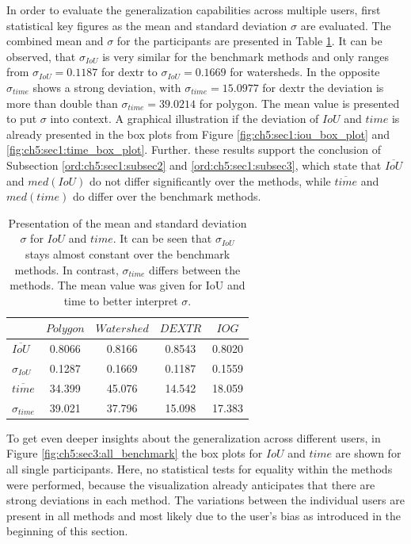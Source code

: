 In order to evaluate the generalization capabilities across multiple users, first statistical key figures as the mean and standard deviation $ \sigma $ are evaluated.
The combined mean and $ \sigma $ for the participants are presented in Table \ref{tab:ch5:all_benchmark_users_varaince}.
It can be observed, that $ \sigma_{IoU} $ is very similar for the benchmark methods and only ranges from $ \sigma_{IoU} = 0.1187 $ for \gls{dextr} to $ \sigma_{IoU} = 0.1669 $ for watersheds.
In the opposite $ \sigma_{time} $ shows a strong deviation, with $ \sigma_{time} = 15.0977 $ for \gls{dextr} the deviation is more than double than $ \sigma_{time} = 39.0214 $ for polygon.
The mean value is presented to put $ \sigma $ into context.
A graphical illustration if the deviation of $ IoU $ and $ time $ is already presented in the box plots from Figure \ref{fig:ch5:sec1:iou_box_plot} and \ref{fig:ch5:sec1:time_box_plot}.
Further. these results support the conclusion of Subsection \ref{ord:ch5:sec1:subsec2} and \ref{ord:ch5:sec1:subsec3}, which state that $ \overline{IoU} $ and $ med(IoU) $ do not differ significantly over the methods, while $ \overline{time} $ and $ med(time) $ do differ over the benchmark methods.
\begin{table}[h!]
	\centering
	\begin{tabular}{l|c c c c}
		\toprule 		
			 				& $ Polygon $  	& $ Watershed $ 	& $ DEXTR $ 	& $ IOG $	\\
		\midrule
		$ \overline{IoU} $	& 0.8066 		& 0.8166		 	& 0.8543		& 0.8020	\\
		$ \sigma_{IoU} $	& 0.1287 		& 0.1669		 	& 0.1187 		& 0.1559	\\
		$ \overline{time} $	& 34.399 		& 45.076			& 14.542 		& 18.059	\\
		$ \sigma_{time} $	& 39.021 		& 37.796			& 15.098 		& 17.383	\\
		\bottomrule
	\end{tabular}
	\caption[Mean and standard deviation of the benchmark methods]{
		Presentation of the mean and standard deviation $ \sigma $ for $ IoU $ and $ time $.
		It can be seen that $ \sigma_{IoU} $ stays almost constant over the benchmark methods.
		In contrast, $ \sigma_{time} $ differs between the methods.
		The mean value was given for IoU and time to better interpret $ \sigma $.
	}\label{tab:ch5:all_benchmark_users_varaince}	
\end{table}

To get even deeper insights about the generalization across different users, in Figure \ref{fig:ch5:sec3:all_benchmark} the box plots for $ IoU $ and $ time $ are shown for all single participants.
Here, no statistical tests for equality within the methods were performed, because the visualization already anticipates that there are strong deviations in each method.
The variations between the individual users are present in all methods and most likely due to the user's bias as introduced in the beginning of this section.

